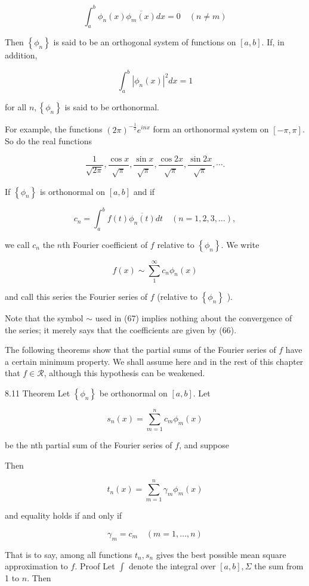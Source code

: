 \documentclass[10pt]{article}
\begin{document}
$$
\int_{a}^{b} \phi_{n}(x) \overline{\phi_{m}(x)} d x=0 \quad(n \neq m)
$$

Then $\left\{\phi_{n}\right\}$ is said to be an orthogonal system of functions on $[a, b]$. If, in addition,

$$
\int_{a}^{b}\left|\phi_{n}(x)\right|^{2} d x=1
$$

for all $n,\left\{\phi_{n}\right\}$ is said to be orthonormal.

For example, the functions $(2 \pi)^{-\frac{1}{2}} e^{i n x}$ form an orthonormal system on $[-\pi, \pi]$. So do the real functions

$$
\frac{1}{\sqrt{2 \pi}}, \frac{\cos x}{\sqrt{\pi}}, \frac{\sin x}{\sqrt{\pi}}, \frac{\cos 2 x}{\sqrt{\pi}}, \frac{\sin 2 x}{\sqrt{\pi}}, \cdots .
$$

If $\left\{\phi_{n}\right\}$ is orthonormal on $[a, b]$ and if

$$
c_{n}=\int_{a}^{b} f(t) \overline{\phi_{n}(t)} d t \quad(n=1,2,3, \ldots),
$$

we call $c_{n}$ the $n$th Fourier coefficient of $f$ relative to $\left\{\phi_{n}\right\}$. We write

$$
f(x) \sim \sum_{1}^{\infty} c_{n} \phi_{n}(x)
$$

and call this series the Fourier series of $f$ (relative to $\left\{\phi_{n}\right\}$ ).

Note that the symbol $\sim$ used in (67) implies nothing about the convergence of the series; it merely says that the coefficients are given by (66).

The following theorems show that the partial sums of the Fourier series of $f$ have a certain minimum property. We shall assume here and in the rest of this chapter that $f \in \mathscr{R}$, although this hypothesis can be weakened.

8.11 Theorem Let $\left\{\phi_{n}\right\}$ be orthonormal on $[a, b]$. Let

$$
s_{n}(x)=\sum_{m=1}^{n} c_{m} \phi_{m}(x)
$$

be the nth partial sum of the Fourier series of $f$, and suppose

Then

$$
t_{n}(x)=\sum_{m=1}^{n} \gamma_{m} \phi_{m}(x)
$$

and equality holds if and only if

$$
\gamma_{m}=c_{m} \quad(m=1, \ldots, n)
$$

That is to say, among all functions $t_{n}, s_{n}$ gives the best possible mean square approximation to $f$. Proof Let $\int$ denote the integral over $[a, b], \Sigma$ the sum from 1 to $n$. Then
\end{document}
